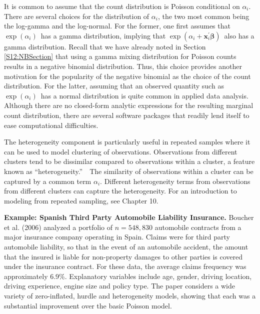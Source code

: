 {It is common to assume that the count distribution is Poisson
conditional on $\alpha_i$. There are several choices for the
distribution of $\alpha_i$, the two most common being the log-gamma
and the log-normal. For the former, one first assumes that $\exp
\left( \alpha_i\right) $\ has a gamma distribution, implying that
$\exp \left( \alpha_i + \mathbf{x}_i^{\prime} \boldsymbol
\beta\right) $\ also has a gamma distribution. Recall that we have
already noted in Section \ref{S12:NBSection} that using a gamma
mixing distribution for Poisson counts results in a negative
binomial distribution. Thus, this choice provides another motivation
for the popularity of the negative binomial as the choice of the
count distribution. For the latter, assuming that an observed
quantity such as $\exp \left( \alpha_i\right) $\ has a normal
distribution is quite common in applied data analysis. Although
there are no closed-form analytic expressions for the resulting
marginal count distribution, there are several software packages
that readily lend itself to ease computational difficulties.

The heterogeneity component is particularly useful in repeated
samples where it can be used to model clustering of observations.
Observations from different clusters tend to be dissimilar compared
to observations within a cluster, a feature known as
\textquotedblleft heterogeneity.\textquotedblright\ \ The similarity
of observations within a cluster can be captured by a common term
$\alpha_i$. Different heterogeneity terms from observations from
different clusters can capture the heterogeneity. For an
introduction to modeling from repeated sampling, see Chapter 10.

\linejed{}

\textbf{Example: Spanish Third Party Automobile Liability
Insurance.} Boucher et al. (2006) analyzed a portfolio of $n=548,830$
automobile contracts from a major insurance company operating in
Spain. Claims were for third party automobile liability, so that in
the event of an automobile accident, the amount that the insured is
liable for non-property damages to other parties is covered under
the insurance contract. For these data, the average claims frequency
was approximately 6.9\%. Explanatory variables include age, gender,
driving location, driving experience, engine size and policy type.
The paper considers a wide variety of zero-inflated, hurdle and
heterogeneity models, showing that each was a substantial
improvement over the basic Poisson model.

}
